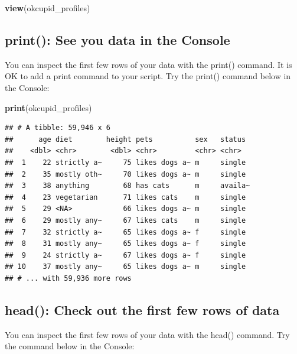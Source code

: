 \documentclass[
]{krantz}
\makeatletter
\newenvironment{Shaded}{\begin{snugshade}}{\end{snugshade}}
\newcommand{\KeywordTok}[1]{\textcolor[rgb]{0.27,0.27,0.27}{\textbf{#1}}}
\newcommand{\NormalTok}[1]{#1}
\newenvironment{kframe}{%
\medskip{}
\setlength{\fboxsep}{.8em}
 \def\at@end@of@kframe{}%
 \ifinner\ifhmode%
  \def\at@end@of@kframe{\end{minipage}}%
  \begin{minipage}{\columnwidth}%
 \fi\fi%
 \def\FrameCommand##1{\hskip\@totalleftmargin \hskip-\fboxsep
 \colorbox{shadecolor}{##1}\hskip-\fboxsep
     \hskip-\linewidth \hskip-\@totalleftmargin \hskip\columnwidth}%
 \MakeFramed {\advance\hsize-\width
   \@totalleftmargin\z@ \linewidth\hsize
   \@setminipage}}%
 {\par\unskip\endMakeFramed%
 \at@end@of@kframe}
\renewenvironment{Shaded}{\begin{kframe}}{\end{kframe}}
\makeatother
\begin{document}
\begin{Shaded}
\begin{Highlighting}[]
\KeywordTok{view}\NormalTok{(okcupid_profiles)}
\end{Highlighting}
\end{Shaded}

\hypertarget{print-see-you-data-in-the-console}{%
\subsection{print(): See you data in the Console}\label{print-see-you-data-in-the-console}}

You can inspect the first few rows of your data with the print() command. It is OK to add a print command to your script. Try the print() command below in the Console:

\begin{Shaded}
\begin{Highlighting}[]
\KeywordTok{print}\NormalTok{(okcupid_profiles)}
\end{Highlighting}
\end{Shaded}

\begin{verbatim}
## # A tibble: 59,946 x 6
##      age diet        height pets          sex   status 
##    <dbl> <chr>        <dbl> <chr>         <chr> <chr>  
##  1    22 strictly a~     75 likes dogs a~ m     single 
##  2    35 mostly oth~     70 likes dogs a~ m     single 
##  3    38 anything        68 has cats      m     availa~
##  4    23 vegetarian      71 likes cats    m     single 
##  5    29 <NA>            66 likes dogs a~ m     single 
##  6    29 mostly any~     67 likes cats    m     single 
##  7    32 strictly a~     65 likes dogs a~ f     single 
##  8    31 mostly any~     65 likes dogs a~ f     single 
##  9    24 strictly a~     67 likes dogs a~ f     single 
## 10    37 mostly any~     65 likes dogs a~ m     single 
## # ... with 59,936 more rows
\end{verbatim}

\hypertarget{head-check-out-the-first-few-rows-of-data}{%
\subsection{head(): Check out the first few rows of data}\label{head-check-out-the-first-few-rows-of-data}}

You can inspect the first few rows of your data with the head() command. Try the command below in the Console:
\end{document}
